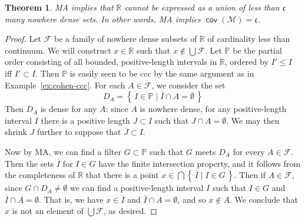 \documentclass[11pt,oneside,a4paper]{amsbook}
\newcommand{\set}[1]{\left\{\,#1\,\right\}}
\newcommand{\R}{\mathbb R}
\newcommand{\PP}{\mathbb P}
\newcommand{\Meager}{\mathcal M}
\DeclareMathOperator{\dom}{dom}
\DeclareMathOperator{\cov}{\mathsf{cov}}
\DeclareMathOperator{\Diff}{Diff}
\theoremstyle{definition}
\theoremstyle{plain}
\newtheorem{theorem}{Theorem}[section]
\theoremstyle{definition}
\theoremstyle{remark}
\numberwithin{equation}{section}
\numberwithin{figure}{section}
\begin{document}
\begin{theorem}
  \label{thm:ma-covm}
  MA implies that $\R$ cannot be expressed as a union of less than $\mathfrak c$ many nowhere dense sets. In other words, MA implies $\cov(\Meager)=\mathfrak c$.
\end{theorem}

\begin{proof}
  Let $\mathcal F$ be a family of nowhere dense subsets of $\R$ of cardinality less than continuum. We will construct $x\in\R$ such that $x\notin\bigcup\mathcal F$. Let $\PP$ be the partial order consisting of all bounded, positive-length intervals in $\R$, ordered by $I'\leq I$ iff $I'\subset I$. Then $\PP$ is easily seen to be ccc by the same argument as in Example~\ref{ex:cohen-ccc}. For each $A\in\mathcal F$, we consider the set
  \[D_A=\set{I\in\PP\mid \overline{I}\cap A=\emptyset}
  \]
  Then $D_A$ is dense for any $A$: since $A$ is nowhere dense, for any positive-length interval $I$ there is a positive length $J\subset I$ such that $J\cap A=\emptyset$. We may then shrink $J$ further to suppose that $\overline{J}\subset I$.

  Now by MA, we can find a filter $G\subset\PP$ such that $G$ meets $D_A$ for every $A\in\mathcal F$. Then the sets $\overline{I}$ for $I\in G$ have the finite intersection property, and it follows from the completeness of $\R$ that there is a point $x\in\bigcap\set{\overline{I}\mid I\in G}$. Then if $A\in\mathcal F$, since $G\cap D_A\neq\emptyset$ we can find a positive-length interval $I$ such that $I\in G$ and $\overline{I}\cap A=\emptyset$. That is, we have $x\in\overline{I}$ and $\overline{I}\cap A=\emptyset$, and so $x\notin A$. We conclude that $x$ is not an element of $\bigcup\mathcal F$, as desired.
\end{proof}


\end{document}
